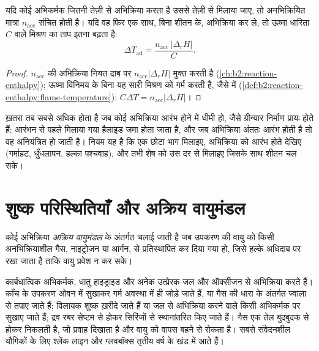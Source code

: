 \begin{proposition}[संचयन]\label{prop:b2:lab-techniques-2:accumulation}
यदि कोई अभिकर्मक जितनी तेज़ी से अभिक्रिया करता है उससे तेज़ी से मिलाया जाए, तो अनभिक्रियित मात्रा $n_{\mathrm{acc}}$ संचित होती है। यदि
वह फिर एक साथ, बिना शीतन के, अभिक्रिया कर ले, तो ऊष्मा धारिता $C$ वाले मिश्रण का ताप इतना बढ़ता है:
\begin{equation*}
\Delta T_{\mathrm{ad}} = \frac{n_{\mathrm{acc}}\,|\Delta_rH|}{C}.
\end{equation*}
\end{proposition}

\begin{proof}
$n_{\mathrm{acc}}$ की अभिक्रिया नियत दाब पर $n_{\mathrm{acc}}|\Delta_rH|$ मुक्त करती है
(\cref{ch:b2:reaction-enthalpy}); ऊष्मा विनिमय के बिना यह सारी मिश्रण को गर्म करती है, जैसे
 में (\cref{def:b2:reaction-enthalpy:flame-temperature}): $C\Delta T =
n_{\mathrm{acc}}|\Delta_rH|$।
\end{proof}

ख़तरा तब सबसे अधिक होता है जब कोई अभिक्रिया आरंभ होने में धीमी हो, जैसे ग्रीन्यार निर्माण प्रायः होते हैं: आरंभन से पहले मिलाया गया
हैलाइड जमा होता जाता है, और जब अभिक्रिया अंततः आरंभ होती है तो वह अनियंत्रित हो जाती है। नियम यह है कि एक छोटा
भाग मिलाइए, अभिक्रिया को आरंभ होते देखिए (गर्माहट, धुँधलापन, हल्का पश्चवाह), और तभी शेष को
उस दर से मिलाइए जिसके साथ शीतन चल सके।

\section{शुष्क परिस्थितियाँ और अक्रिय वायुमंडल}

\begin{definition}[अक्रिय वायुमंडल]\label{def:b2:lab-techniques-2:inert}
कोई अभिक्रिया \emph{अक्रिय वायुमंडल} के अंतर्गत चलाई जाती है जब उपकरण की वायु
को किसी अनभिक्रियाशील गैस, नाइट्रोजन या आर्गन, से प्रतिस्थापित कर दिया गया हो, जिसे हल्के अधिदाब पर रखा जाता है ताकि वायु
प्रवेश न कर सके।
\end{definition}

कार्बधात्विक अभिकर्मक, धातु हाइड्राइड और अनेक उत्प्रेरक जल और ऑक्सीजन से अभिक्रिया करते हैं। काँच के उपकरण
ओवन में सुखाकर गर्म अवस्था में ही जोड़े जाते हैं, या गैस की धारा के अंतर्गत ज्वाला से तपाए जाते हैं; विलायक शुष्क ख़रीदे जाते हैं या
जल से अभिक्रिया करने वाले किसी अभिकर्मक पर सुखाए जाते हैं; द्रव रबर सेप्टम से होकर सिरिंजों से स्थानांतरित किए जाते हैं।
गैस एक तेल बुदबुदक से होकर निकलती है, जो प्रवाह दिखाता है और वायु को वापस बहने से रोकता है।
सबसे संवेदनशील यौगिकों के लिए श्लेंक लाइन और ग्लवबॉक्स तृतीय वर्ष के खंड में आते हैं।

